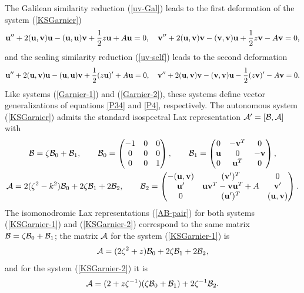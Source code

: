 \documentclass[11pt]{article}
\theoremstyle{plain}
\theoremstyle{definition}
\begin{document}
The Galilean similarity reduction (\ref{uv-Gal}) leads to the first deformation of the system (\ref{KSGarnier})
\begin{equation}\label{KSGarnier-1}
 {\bf u}''+2({\bf u},{\bf v}){\bf u}-({\bf u},{\bf u}){\bf v}+\frac{1}{2}z{\bf u}+A{\bf u}=0,\quad
 {\bf v}''+2({\bf u},{\bf v}){\bf v}-({\bf v},{\bf v}){\bf u}+\frac{1}{2}z{\bf v}-A{\bf v}=0,
\end{equation}
and the scaling similarity reduction (\ref{uv-self}) leads to the second deformation 
\begin{equation}\label{KSGarnier-2}
 {\bf u}''+2({\bf u},{\bf v}){\bf u}-({\bf u},{\bf u}){\bf v}+\frac{1}{2}(z{\bf u})'+A{\bf u}=0,\quad
 {\bf v}''+2({\bf u},{\bf v}){\bf v}-({\bf v},{\bf v}){\bf u}-\frac{1}{2}(z{\bf v})'-A{\bf v}=0.
\end{equation}
Like systems (\ref{Garnier-1}) and (\ref{Garnier-2}), these systems define vector generalizations of equations \ref{P34} and \ref{P4}, respectively. The autonomous system (\ref{KSGarnier}) admits the standard isospectral Lax representation ${\cal A}'=[{\cal B},{\cal A}]$ with
\begin{gather*}
 {\cal B}=\zeta{\cal B}_0 +{\cal B}_1,\qquad
 {\cal B}_0=\begin{pmatrix}
  -1 & 0 & 0\\
   0 & 0 & 0\\
   0 & 0 & 1
 \end{pmatrix},\qquad
 {\cal B}_1=\begin{pmatrix}
  0 & -{\bf v}^T & 0\\
  {\bf u} &  0   & -{\bf v}\\
  0 &  {\bf u}^T & 0
 \end{pmatrix},\\
 {\cal A}=2(\zeta^2-k^2){\cal B}_0+2\zeta{\cal B}_1+2{\cal B}_2,\qquad
 {\cal B}_2=\begin{pmatrix}
   -({\bf u},{\bf v}) & ({\bf v}')^T & 0\\
   {\bf u}' & {\bf u}{\bf v}^T-{\bf v}{\bf u}^T+A & {\bf v}'\\
   0 & ({\bf u}')^T & ({\bf u},{\bf v}) 
 \end{pmatrix}.
\end{gather*}
The isomonodromic Lax representations (\ref{AB-pair}) for both systems (\ref{KSGarnier-1}) and (\ref{KSGarnier-2}) correspond to the same matrix ${\cal B}=\zeta{\cal B}_0 +{\cal B}_1$; the matrix $\cal A$ for the system (\ref{KSGarnier-1}) is
\[
 {\cal A}=(2\zeta^2+z){\cal B}_0+2\zeta{\cal B}_1+2{\cal B}_2,
\]
and for the system (\ref{KSGarnier-2}) it is
\[
 {\cal A}=(2+z\zeta^{-1})(\zeta{\cal B}_0 +{\cal B}_1)+2\zeta^{-1}{\cal B}_2.
\]
\end{document}
